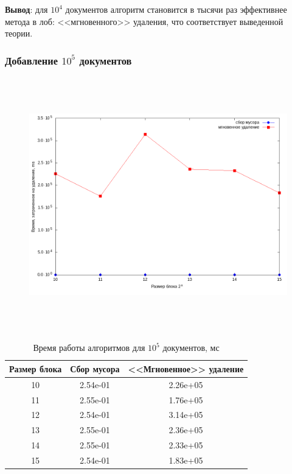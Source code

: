 \textbf{Вывод}: для $10^4$ документов алгоритм становится в тысячи раз
эффективнее метода в лоб: <<мгновенного>> удаления, что соответствует выведенной теории.

\subsubsection{Добавление $10^5$ документов}

\begin{figure}[H]
\includegraphics[width=\linewidth, height=11cm]{fig/time_1e5.png}
\end{figure}

\begin{table}[H]
      \caption{Время работы алгоритмов для $10^5$ документов, мс}
      \centering
      \small
      \singlespacing
      \begin{tabular}{|c|c|c|}
            \hline
            Размер блока & Сбор мусора                & <<Мгновенное>> удаление \\ \hline \hline
            10           & 2.54e-01                   & 2.26e+05              \\ \hline
            11           & 2.55e-01                   & 1.76e+05              \\ \hline
            12           & 2.54e-01                   & 3.14e+05              \\ \hline
            13           & 2.55e-01                   & 2.36e+05              \\ \hline
            14           & 2.55e-01                   & 2.33e+05              \\ \hline
            15           & 2.54e-01                   & 1.83e+05              \\ \hline
\end{tabular}
\end{table}

